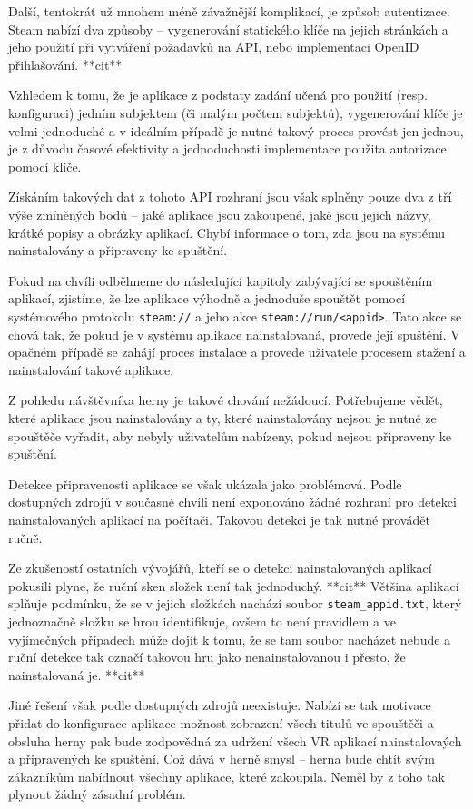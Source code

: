 Další, tentokrát už mnohem méně závažnější komplikací, je způsob
autentizace. Steam nabízí dva způsoby
-- vygenerování statického klíče na jejich stránkách a jeho použití
při vytváření požadavků na API, nebo implementaci OpenID přihlašování. **cit**

Vzhledem k tomu, že je aplikace z podstaty zadání učená pro použití
(resp. konfiguraci) jedním subjektem (či malým počtem subjektů),
vygenerování klíče je velmi jednoduché a v ideálním případě je nutné
takový proces provést jen jednou, je z důvodu časové efektivity a 
jednoduchosti implementace použita autorizace pomocí klíče.

Získáním takových dat z tohoto API rozhraní jsou však splněny pouze dva
z tří výše zmíněných bodů -- jaké aplikace jsou zakoupené, jaké jsou
jejich názvy, krátké popisy a obrázky aplikací. Chybí informace o tom,
zda jsou na systému nainstalovány a připraveny ke spuštění.

Pokud na chvíli odběhneme do následující kapitoly zabývající se
spouštěním aplikací, zjistíme, že lze aplikace výhodně a jednoduše
spouštět pomocí systémového protokolu \texttt{steam://} a jeho akce
\texttt{steam://run/\textless{}appid\textgreater{}}. Tato akce se chová
tak, že pokud je v systému aplikace nainstalovaná, provede její
spuštění. V opačném případě se zahájí proces instalace a provede
uživatele procesem stažení a nainstalování takové aplikace. 

Z pohledu návštěvníka herny je takové chování nežádoucí. Potřebujeme
vědět, které aplikace jsou nainstalovány a ty, které nainstalovány
nejsou je nutné ze spouštěče vyřadit, aby nebyly uživatelům nabízeny,
pokud nejsou připraveny ke spuštění.

Detekce připravenosti aplikace se však ukázala jako
problémová. Podle dostupných zdrojů v současné chvíli není exponováno
žádné rozhraní pro detekci nainstalovaných aplikací na počítači. 
Takovou detekci je tak nutné provádět ručně. 

Ze zkušeností ostatních vývojářů, kteří se o detekci nainstalovaných aplikací pokusili
plyne, že ruční sken složek není tak jednoduchý. **cit** Většina aplikací splňuje
podmínku, že se v jejich složkách nachází soubor
\texttt{steam\_appid.txt}, který jednoznačně složku se hrou
identifikuje, ovšem to není pravidlem a ve vyjímečných případech může
dojít k tomu, že se tam soubor nacházet nebude a ruční detekce tak 
označí takovou hru jako nenainstalovanou i přesto, že nainstalovaná je. **cit**

Jiné řešení však podle dostupných zdrojů neexistuje. Nabízí se tak
motivace přidat do konfigurace aplikace možnost zobrazení všech titulů
ve spouštěči a obsluha herny pak bude zodpovědná za udržení všech VR aplikací 
nainstalovaých a připravených ke spuštění. Což dává v herně smysl --
herna bude chtít svým zákazníkům nabídnout všechny aplikace, které
zakoupila. Neměl by z toho tak plynout žádný zásadní problém.

